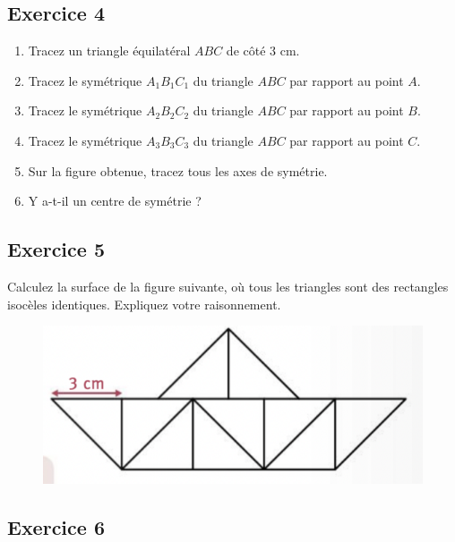 \documentclass[14 pt]{extarticle}
\theoremstyle{plain}
\begin{document}
 \subsection*{Exercice 4}
 \begin{enumerate}
 \item  Tracez un triangle équilatéral $ABC$ de côté $3$ cm. 
\item Tracez le symétrique $A_1B_1C_1$ du triangle $ABC$ par rapport au point $A$.  
\item Tracez le symétrique $A_2B_2C_2$ du triangle $ABC$ par rapport au point $B$.  
\item Tracez le symétrique $A_3B_3C_3$ du triangle $ABC$ par rapport au point $C$.  
\item Sur la figure obtenue, tracez tous les axes de symétrie. 
\item Y a-t-il un centre de symétrie ? 
\end{enumerate}
 \subsection*{Exercice 5}
 
Calculez la surface de la figure suivante, où tous les triangles sont des rectangles isocèles identiques. Expliquez votre raisonnement.

\begin{figure}[H]
\center
\includegraphics[scale=1]{Bateau}\end{figure}

\subsection*{Exercice 6}
\end{document}
